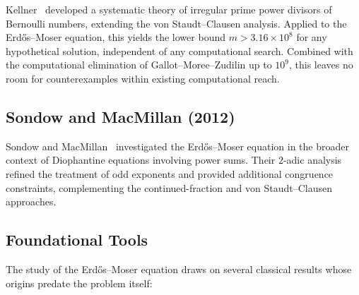 \documentclass[12pt,a4paper]{article}
\theoremstyle{plain}
\theoremstyle{definition}
\begin{document}
Kellner~\cite{Kellner} developed a systematic theory of irregular
prime power divisors of Bernoulli numbers, extending the von
Staudt--Clausen analysis.  Applied to the Erd\H{o}s--Moser equation,
this yields the lower bound $m > 3.16 \times 10^8$ for any
hypothetical solution, independent of any computational search.
Combined with the computational elimination of Gallot--Moree--Zudilin
up to $10^9$, this leaves no room for counterexamples within existing
computational reach.

\subsection{Sondow and MacMillan (2012)}

Sondow and MacMillan~\cite{SondowMacMillan} investigated the
Erd\H{o}s--Moser equation in the broader context of Diophantine
equations involving power sums.  Their $2$-adic analysis refined
the treatment of odd exponents and provided additional congruence
constraints, complementing the continued-fraction and von
Staudt--Clausen approaches.

\subsection{Foundational Tools}

The study of the Erd\H{o}s--Moser equation draws on several classical
results whose origins predate the problem itself:
\end{document}
